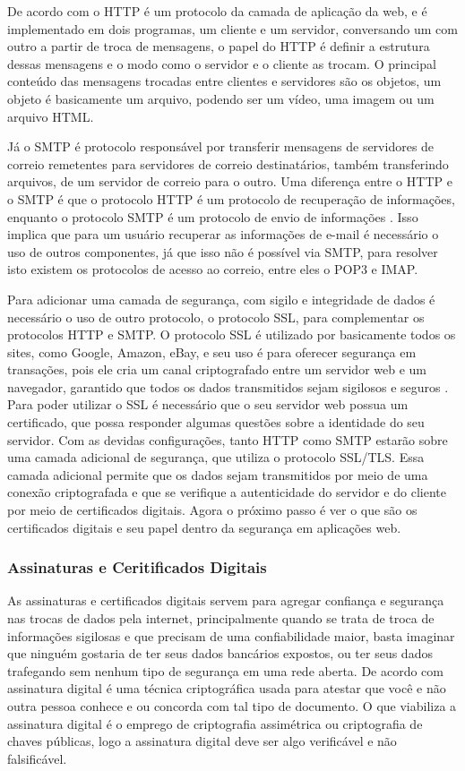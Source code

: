 De acordo com \cite{kurose2010redes} o HTTP é um protocolo da camada de aplicação
da web, e é implementado em dois programas, um cliente e um servidor, conversando
um com outro a partir de troca de mensagens, o papel do HTTP é definir a estrutura dessas
mensagens e o modo como o servidor e o cliente as trocam. O principal conteúdo das
mensagens trocadas entre clientes e servidores são os objetos, um objeto é basicamente
um arquivo, podendo ser um vídeo, uma imagem ou um arquivo HTML.

Já o SMTP é protocolo responsável por transferir mensagens de servidores de correio
remetentes para servidores de correio destinatários, também transferindo arquivos,
de um servidor de correio para o outro. Uma diferença entre o HTTP e o SMTP
é que o protocolo HTTP é um protocolo de recuperação de informações, enquanto
o protocolo SMTP é um protocolo de envio de informações \cite{kuroseredes2010}. Isso implica que para um
usuário recuperar as informações de e-mail é necessário o uso de outros componentes,
já que isso não é possível via SMTP, para resolver isto existem os protocolos
de acesso ao correio, entre eles o POP3 e IMAP.

Para adicionar uma camada de segurança, com sigilo e integridade de dados é necessário
o uso de outro protocolo, o protocolo SSL, para complementar os protocolos HTTP
e SMTP. O protocolo SSL é utilizado por basicamente todos os sites, como Google,
Amazon, eBay, e seu uso é para oferecer segurança em transações, pois ele cria um
canal criptografado entre um servidor web e um navegador, garantido que todos os
dados transmitidos sejam sigilosos e seguros \cite{kuroseredes2010}. Para poder utilizar o SSL é necessário
que o seu servidor web possua um certificado, que possa responder algumas questões
sobre a identidade do seu servidor. Com as devidas configurações, tanto HTTP como
SMTP estarão sobre uma camada adicional de segurança, que utiliza o protocolo SSL/TLS.
 Essa camada adicional permite que os dados sejam transmitidos por meio de uma
conexão criptografada e que se verifique a autenticidade do servidor e do cliente
 por meio de certificados digitais. Agora o próximo passo é ver o que são os certificados
 digitais e seu papel dentro da segurança em aplicações web.

\subsubsection{Assinaturas e Ceritificados Digitais}

As assinaturas e certificados digitais servem para agregar confiança e segurança
nas trocas de dados pela internet, principalmente quando se trata de troca de informações
sigilosas e que precisam de uma confiabilidade maior, basta imaginar que ninguém
gostaria de ter seus dados bancários expostos, ou ter seus dados trafegando sem
nenhum tipo de segurança em uma rede aberta. De acordo com \cite{kuroseredes2010}
assinatura digital é uma técnica criptográfica usada para atestar que você e não
outra pessoa conhece e ou concorda com tal tipo de documento. O que viabiliza a
assinatura digital é o emprego de criptografia assimétrica ou criptografia de chaves
públicas, logo a assinatura digital deve ser algo verificável e não falsificável.

